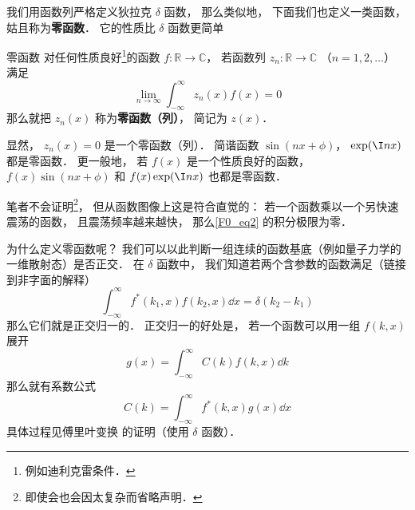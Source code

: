 
我们用函数列严格定义狄拉克 $\delta$ 函数， 那么类似地， 下面我们也定义一类函数， 姑且称为\textbf{零函数}． 它的性质比 $\delta$ 函数更简单
\begin{definition}{零函数}
对任何性质良好\footnote{例如迪利克雷条件．}的函数 $f: \mathbb R \to \mathbb C$， 若函数列 $z_n: \mathbb R \to \mathbb C$ （$n = 1, 2, \dots$） 满足
\begin{equation}\label{F0_eq2}
\lim_{n\to \infty}\int_{-\infty}^{\infty} z_n(x) f(x) = 0
\end{equation}
那么就把 $z_n(x)$ 称为\textbf{零函数（列）}， 简记为 $z(x)$．
\end{definition}

\begin{example}{}
显然， $z_n(x) = 0$ 是一个零函数（列）． 简谐函数 $\sin(nx + \phi)$， $\exp(\I n x)$ 都是零函数． 更一般地， 若 $f(x)$ 是一个性质良好的函数， $f(x)\sin(nx + \phi)$ 和 $f(x)\exp(\I n x)$ 也都是零函数．

笔者不会证明\footnote{即使会也会因太复杂而省略声明．}， 但从函数图像上这是符合直觉的： 若一个函数乘以一个另快速震荡的函数， 且震荡频率越来越快， 那么\autoref{F0_eq2} 的积分极限为零．
\end{example}

为什么定义零函数呢？ 我们可以以此判断一组连续的函数基底（例如量子力学的一维散射态）是否正交． 在 $\delta$ 函数中， 我们知道若两个含参数的函数满足（链接到非字面的解释）
\begin{equation}\label{F0_eq1}
\int_{-\infty}^{\infty} f^*(k_1, x) f(k_2, x)\dd{x} = \delta(k_2 - k_1)
\end{equation}
那么它们就是正交归一的． 正交归一的好处是， 若一个函数可以用一组 $f(k, x)$ 展开
\begin{equation}
g(x) = \int_{-\infty}^{\infty} C(k) f(k, x) \dd{k}
\end{equation}
那么就有系数公式
\begin{equation}
C(k) = \int_{-\infty}^{\infty} f^*(k, x)g(x)\dd{x}
\end{equation}
具体过程见傅里叶变换 的证明（使用 $\delta$ 函数）．

